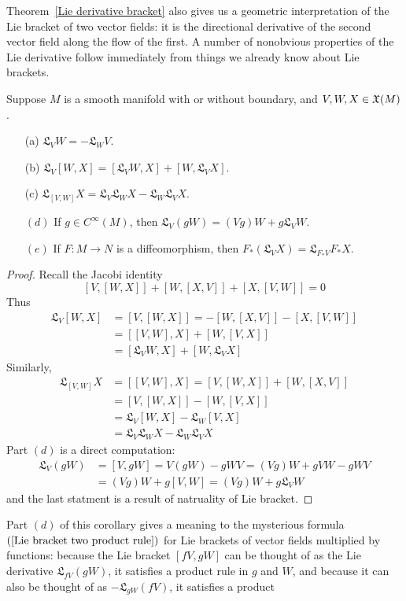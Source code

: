 Theorem~\ref{Lie derivative bracket} also gives us a geometric interpretation of the Lie bracket of two vector fields: it is the directional derivative of the second vector field along the flow of the first. A number of nonobvious properties of the Lie derivative follow immediately from things we already know about Lie brackets.
\begin{corollary}
Suppose $M$ is a smooth manifold with or without boundary, and $V,W,X\in\mathfrak{X}(M)$.
\begin{itemize}
\item[(a)] $\mathfrak{L}_VW=-\mathfrak{L}_WV$.
\item[(b)] $\mathfrak{L}_V[W,X]=[\mathfrak{L}_VW,X]+[W,\mathfrak{L}_VX]$.
\item[(c)] $\mathfrak{L}_{[V,W]}X=\mathfrak{L}_V\mathfrak{L}_WX-\mathfrak{L}_W\mathfrak{L}_VX$.
\item[$(d)$] If $g\in C^\infty(M)$, then $\mathfrak{L}_V(gW)=(Vg)W+g\mathfrak{L}_VW$.
\item[$(e)$] If $F:M\to N$ is a diffeomorphism, then $F_*(\mathfrak{L}_VX)=\mathfrak{L}_{F_*V}F_*X$.
\end{itemize}
\end{corollary}
\begin{proof}
Recall the Jacobi identity
\[[V,[W,X]]+[W,[X,V]]+[X,[V,W]]=0\]
Thus
\begin{align*}
\mathfrak{L}_V[W,X]&=[V,[W,X]]=-[W,[X,V]]-[X,[V,W]]\\
&=[[V,W],X]+[W,[V,X]]\\
&=[\mathfrak{L}_VW,X]+[W,\mathfrak{L}_VX]
\end{align*}
Similarly,
\begin{align*}
\mathfrak{L}_{[V,W]}X&=[[V,W],X]=[V,[W,X]]+[W,[X,V]]\\
&=[V,[W,X]]-[W,[V,X]]\\
&=\mathfrak{L}_V[W,X]-\mathfrak{L}_W[V,X]\\
&=\mathfrak{L}_V\mathfrak{L}_WX-\mathfrak{L}_W\mathfrak{L}_VX
\end{align*}
Part $(d)$ is a direct computation:
\begin{align*}
\mathfrak{L}_V(gW)&=[V,gW]=V(gW)-gWV=(Vg)W+gVW-gWV\\
&=(Vg)W+g[V,W]=(Vg)W+g\mathfrak{L}_VW
\end{align*}
and the last statment is a result of natruality of Lie bracket.
\end{proof}
Part $(d)$ of this corollary gives a meaning to the mysterious formula $(\ref{Lie bracket two product rule})$ for Lie brackets of vector fields multiplied by functions: because the Lie bracket $[fV,gW]$ can be thought of as the Lie derivative $\mathfrak{L}_{fV}(gW)$, it satisfies a product rule in $g$ and $W$, and because it can also be thought of as $-\mathfrak{L}_{gW}(fV)$, it satisfies a product
